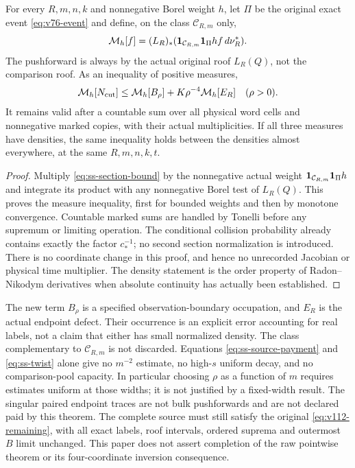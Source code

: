 \begin{theorem}
\label{thm:ss-source}
For every $R,m,n,k$ and nonnegative Borel weight $h$, let $\Pi$ be the
original exact event \eqref{eq:v76-event} and define, on the class
$\mathcal C_{R,m}$ only,
\[
 \mathcal M_h[f]=(L_R)_*
       (\mathbf1_{\mathcal C_{R,m}}\mathbf1_\Pi h f\,d\nu_R^*).
\]
The pushforward is always by the actual original roof $L_R(Q)$,
not the comparison roof. As an inequality of positive measures,
\begin{equation}\label{eq:ss-source-payment}
 \mathcal M_h[N_{\rm cut}]
 \le \mathcal M_h[B_\rho]+K\rho^{-4}\mathcal M_h[E_R]
 \quad(\rho>0).
\end{equation}
It remains valid after a countable sum over all physical word cells
and nonnegative marked copies, with their actual multiplicities. If
all three measures have densities, the same inequality holds between
the densities almost everywhere, at the same $R,m,n,k,t$.
\end{theorem}
\begin{proof}
Multiply \eqref{eq:ss-section-bound} by the nonnegative actual weight
$\mathbf1_{\mathcal C_{R,m}}\mathbf1_\Pi h$ and integrate its product with
any nonnegative Borel test of $L_R(Q)$. This proves the measure
inequality, first for bounded weights and then by monotone
convergence. Countable marked sums are handled by Tonelli before any
supremum or limiting operation. The conditional collision probability
already contains exactly the factor $c_*^{-1}$; no second section
normalization is introduced. There is no coordinate change in this
proof, and hence no unrecorded Jacobian or physical time multiplier.
The density statement is the order property of Radon--Nikodym
derivatives when absolute continuity has actually been established.
\end{proof}

\begin{remark}\label{rem:ss-open}
The new term $B_\rho$ is a specified observation-boundary occupation,
and $E_R$ is the actual endpoint defect. Their occurrence is an
explicit error accounting for real labels, not a claim that either
has small normalized density. The class complementary to
$\mathcal C_{R,m}$ is not discarded. Equations
\eqref{eq:ss-source-payment} and \eqref{eq:ss-twist} alone give no
$m^{-2}$ estimate, no high-$s$ uniform decay, and no comparison-pool
capacity. In particular choosing $\rho$ as a function of $m$ requires
estimates uniform at those widths; it is not justified by a
fixed-width result. The singular paired endpoint traces are not bulk
pushforwards and are not declared paid by this theorem. The complete
source must still satisfy the original
\eqref{eq:v112-remaining}, with all exact labels, roof intervals,
ordered suprema and outermost $B$ limit unchanged. This paper does
not assert completion of the raw pointwise theorem or its
four-coordinate inversion consequence.
\end{remark}
